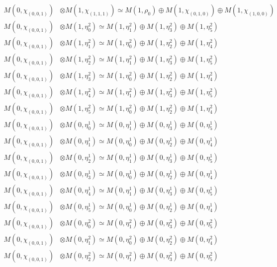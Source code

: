 \begin{align*}
M(0,\chi_{(0,0,1)}) &\otimes M(1,\chi_{(1,1,1)}) \simeq M(1,\rho_{0}) \oplus M(1,\chi_{(0,1,0)}) \oplus M(1,\chi_{(1,0,0)}) \\
M(0,\chi_{(0,0,1)}) &\otimes M(1,\eta^{2}_{0}) \simeq M(1,\eta^{2}_{1}) \oplus M(1,\eta^{2}_{3}) \oplus M(1,\eta^{2}_{5}) \\
M(0,\chi_{(0,0,1)}) &\otimes M(1,\eta^{2}_{1}) \simeq M(1,\eta^{2}_{0}) \oplus M(1,\eta^{2}_{2}) \oplus M(1,\eta^{2}_{4}) \\
M(0,\chi_{(0,0,1)}) &\otimes M(1,\eta^{2}_{2}) \simeq M(1,\eta^{2}_{1}) \oplus M(1,\eta^{2}_{3}) \oplus M(1,\eta^{2}_{5}) \\
M(0,\chi_{(0,0,1)}) &\otimes M(1,\eta^{2}_{3}) \simeq M(1,\eta^{2}_{0}) \oplus M(1,\eta^{2}_{2}) \oplus M(1,\eta^{2}_{4}) \\
M(0,\chi_{(0,0,1)}) &\otimes M(1,\eta^{2}_{4}) \simeq M(1,\eta^{2}_{1}) \oplus M(1,\eta^{2}_{3}) \oplus M(1,\eta^{2}_{5}) \\
M(0,\chi_{(0,0,1)}) &\otimes M(1,\eta^{2}_{5}) \simeq M(1,\eta^{2}_{0}) \oplus M(1,\eta^{2}_{2}) \oplus M(1,\eta^{2}_{4}) \\
M(0,\chi_{(0,0,1)}) &\otimes M(0,\eta^{1}_{0}) \simeq M(0,\eta^{1}_{1}) \oplus M(0,\eta^{1}_{3}) \oplus M(0,\eta^{1}_{5}) \\
M(0,\chi_{(0,0,1)}) &\otimes M(0,\eta^{1}_{1}) \simeq M(0,\eta^{1}_{0}) \oplus M(0,\eta^{1}_{2}) \oplus M(0,\eta^{1}_{4}) \\
M(0,\chi_{(0,0,1)}) &\otimes M(0,\eta^{1}_{2}) \simeq M(0,\eta^{1}_{1}) \oplus M(0,\eta^{1}_{3}) \oplus M(0,\eta^{1}_{5}) \\
M(0,\chi_{(0,0,1)}) &\otimes M(0,\eta^{1}_{3}) \simeq M(0,\eta^{1}_{0}) \oplus M(0,\eta^{1}_{2}) \oplus M(0,\eta^{1}_{4}) \\
M(0,\chi_{(0,0,1)}) &\otimes M(0,\eta^{1}_{4}) \simeq M(0,\eta^{1}_{1}) \oplus M(0,\eta^{1}_{3}) \oplus M(0,\eta^{1}_{5}) \\
M(0,\chi_{(0,0,1)}) &\otimes M(0,\eta^{1}_{5}) \simeq M(0,\eta^{1}_{0}) \oplus M(0,\eta^{1}_{2}) \oplus M(0,\eta^{1}_{4}) \\
M(0,\chi_{(0,0,1)}) &\otimes M(0,\eta^{2}_{0}) \simeq M(0,\eta^{2}_{1}) \oplus M(0,\eta^{2}_{3}) \oplus M(0,\eta^{2}_{5}) \\
M(0,\chi_{(0,0,1)}) &\otimes M(0,\eta^{2}_{1}) \simeq M(0,\eta^{2}_{0}) \oplus M(0,\eta^{2}_{2}) \oplus M(0,\eta^{2}_{4}) \\
M(0,\chi_{(0,0,1)}) &\otimes M(0,\eta^{2}_{2}) \simeq M(0,\eta^{2}_{1}) \oplus M(0,\eta^{2}_{3}) \oplus M(0,\eta^{2}_{5}) \\

\end{align*}
